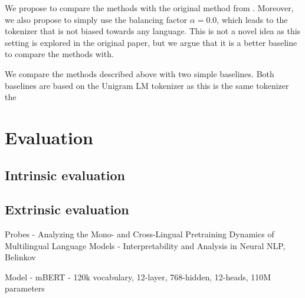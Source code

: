 
We propose to compare the methods with the original method from \citet{conneau_unsupervised_2020}. Moreover, we also propose to simply use the balancing factor $\alpha=0.0$, which leads to the tokenizer that is not biased towards any language. This is not a novel idea as this setting is explored in the original paper, but we argue that it is a better baseline to compare the methods with.

We compare the methods described above with two simple baselines. Both baselines are based on the Unigram LM tokenizer as this is the same tokenizer the 


\section{Evaluation}

\subsection{Intrinsic evaluation}

\subsection{Extrinsic evaluation}


Probes
- Analyzing the Mono- and Cross-Lingual Pretraining Dynamics of Multilingual Language Models
- Interpretability and Analysis in Neural NLP, Belinkov

Model
- mBERT - 120k vocabulary, 12-layer, 768-hidden, 12-heads, 110M parameters